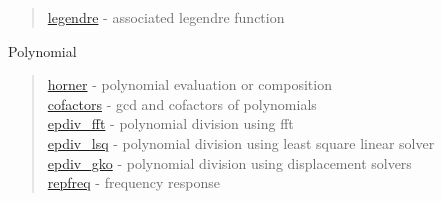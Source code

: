 \begin{quote}
\noindent
\hyperlink{legendre}{legendre} - associated legendre function\\
\end{quote}

Polynomial 

\begin{quote}
\noindent
\hyperlink{horner}{horner} - polynomial evaluation or composition \\
\hyperlink{cofactors}{cofactors} - gcd and cofactors of polynomials \\
\hyperlink{epdiv_fft}{epdiv\_fft} - {polynomial division using fft}\\ 
\hyperlink{epdiv_lsq}{epdiv\_lsq} - {polynomial division using least square linear solver}\\ 
\hyperlink{epdiv_gko}{epdiv\_gko} - { polynomial division using displacement solvers}\\
\hyperlink{repfreq}{repfreq} - {frequency response} \\
\end{quote}




 
 
 
 
 
 





